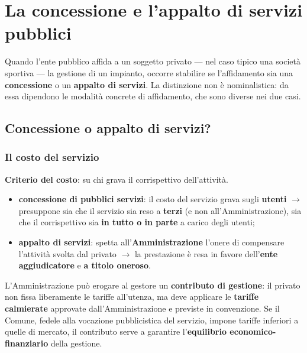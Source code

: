 \chapter{La concessione e l'appalto di servizi pubblici}

Quando l'ente pubblico affida a un soggetto privato --- nel caso tipico una società sportiva ---
la gestione di un impianto, occorre stabilire se l'affidamento sia una \textbf{concessione} o un
\textbf{appalto di servizi}. La distinzione non è nominalistica: da essa dipendono le modalità
concrete di affidamento, che sono diverse nei due casi.

\section{Concessione o appalto di servizi?}

\subsection{Il costo del servizio}

\textbf{Criterio del costo}: su chi grava il corrispettivo dell'attività.

\begin{itemize}
  \item \textbf{concessione di pubblici servizi}: il costo del servizio grava sugli
    \textbf{utenti} $\rightarrow$ presuppone sia che il servizio sia reso a \textbf{terzi} (e non
    all'Amministrazione), sia che il corrispettivo sia \textbf{in tutto o in parte} a carico degli
    utenti;
  \item \textbf{appalto di servizi}: spetta all'\textbf{Amministrazione} l'onere di compensare
    l'attività svolta dal privato $\rightarrow$ la prestazione è resa in favore dell'\textbf{ente
    aggiudicatore} e \textbf{a titolo oneroso}.
\end{itemize}


L'Amministrazione può erogare al gestore un \textbf{contributo di gestione}: il privato non fissa
liberamente le tariffe all'utenza, ma deve applicare le \textbf{tariffe calmierate} approvate
dall'Amministrazione e previste in convenzione. Se il Comune, fedele alla vocazione pubblicistica
del servizio, impone tariffe inferiori a quelle di mercato, il contributo serve a garantire
l'\textbf{equilibrio economico-finanziario} della gestione.

